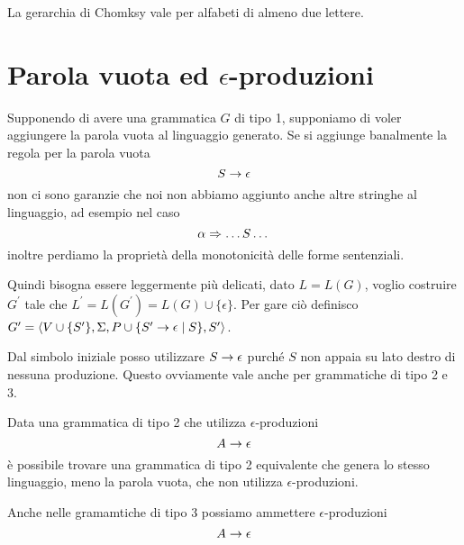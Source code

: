 \documentclass[12pt]{report}
\begin{document}
La gerarchia di Chomksy vale per alfabeti di almeno due lettere.

\section{Parola vuota ed $\epsilon$-produzioni}
Supponendo di avere una grammatica $G$ di tipo 1, supponiamo di voler aggiungere la parola vuota al linguaggio generato.
Se si aggiunge banalmente la regola per la parola vuota
$$ S \rightarrow \epsilon $$
non ci sono garanzie che noi non abbiamo aggiunto anche altre stringhe al linguaggio, ad esempio nel caso
$$ \alpha \Rightarrow \dots S \dots $$
inoltre perdiamo la proprietà della monotonicità delle forme sentenziali.

Quindi bisogna essere leggermente più delicati, dato $L = L(G)$, voglio costruire $G^\prime$ tale che $L^\prime = L(G^\prime) = L(G) \cup \{ \epsilon \}$.
Per gare ciò definisco $G^\prime = \langle V \cup \{S^\prime\}, \Sigma, P \cup \{ S^\prime \rightarrow \epsilon \mid S\}, S^\prime \rangle$.

Dal simbolo iniziale posso utilizzare $S \rightarrow \epsilon$ purché $S$ non appaia su lato destro di nessuna produzione.
Questo ovviamente vale anche per grammatiche di tipo 2 e 3.

Data una grammatica di tipo 2 che utilizza $\epsilon$-produzioni 
$$ A \rightarrow \epsilon $$
è possibile trovare una grammatica di tipo 2 equivalente che genera lo stesso linguaggio, meno la parola vuota, che non utilizza $\epsilon$-produzioni.

Anche nelle gramamtiche di tipo 3 possiamo ammettere $\epsilon$-produzioni
$$ A \rightarrow \epsilon $$
\end{document}
